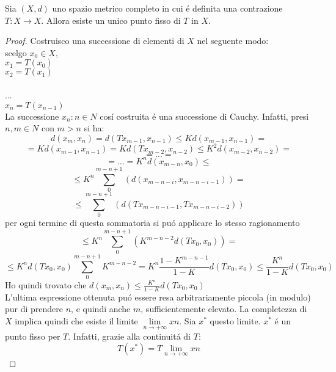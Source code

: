 \theorem
Sia $(X, d)$ uno spazio metrico completo in cui \'e definita una contrazione
$T: X \rightarrow X$. Allora esiste un unico punto fisso di $T$ in $X$.
\begin{proof}
	Costruisco una successione di elementi di $X$ nel seguente modo:\\
	scelgo $x_0\in X$,\\
	$x_1 = T(x_0)$\\
	$x_2 = T(x_1)$\\\\
	...\\
	$x_n = T(x_{n-1})$\\
	La successione ${x_n: n \in N }$ cos\'i costruita \'e una successione di Cauchy. Infatti, presi $n, m \in N$ con $m > n$ si ha:
	$$d(x_{m},x_{n}) = d(Tx_{m-1},x_{n-1}) \le Kd(x_{m-1},x_{n-1})=$$
	$$=Kd(x_{m-1},x_{n-1}) = Kd(Tx_{m-2},x_{n-2}) \le K^2d(x_{m-2},x_{n-2})=$$
	$$=...=$$
	$$=...=K^nd(x_{m-n},x_{0})\le$$
	$$\le K^{n}\sum\limits_0^{m-n+1}(d(x_{m-n-i},x_{m-n-i-1}))=$$
	$$\le \sum\limits_0^{m-n+1}(d(Tx_{m-n-i-1},Tx_{m-n-i-2}))$$
	per ogni termine di questa sommatoria si pu\'o applicare lo stesso ragionamento
	$$\le K^{n}\sum\limits_0^{m-n+1}(K^{m-n-2}d(Tx_{0},x_{0}))=$$
	$$\le K^{n}d(Tx_{0},x_{0})\sum\limits_0^{m-n+1}K^{m-n-2}=K^n\frac{1-K^{m-n-1}}{1-K}d(Tx_{0},x_{0}) \le \frac{K^n}{1-K}d(Tx_{0},x_{0})$$
	Ho quindi trovato che $d(x_{m},x_{n})\le\frac{K^n}{1-K}d(Tx_{0},x_{0})$\\
	L’ultima espressione ottenuta pu\'o essere resa arbitrariamente piccola (in modulo) pur di
	prendere $n$, e quindi anche $m$, sufficientemente elevato. La completezza di $X$ implica quindi
	che esiste il limite $\lim\limits_{n\rightarrow +\infty}xn$. Sia $x^*$ questo limite. $x^*$ \'e un punto fisso per $T$. Infatti, grazie
	alla continuit\'a di $T$:
	$$T(x^*)=T{\lim\limits_{n\rightarrow +\infty}xn}$$

	
	
	
	
\end{proof} 

